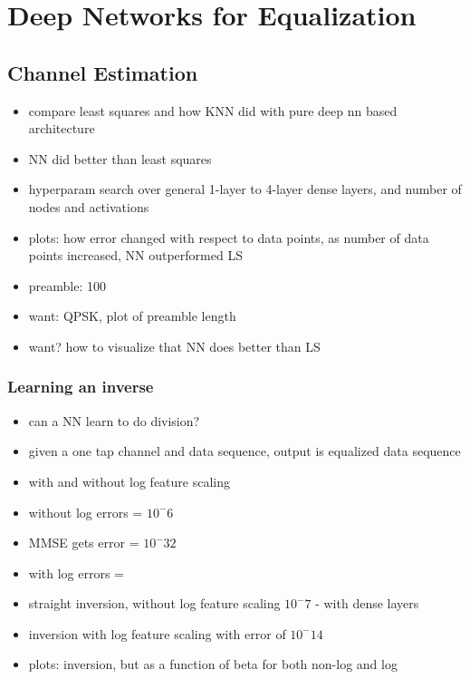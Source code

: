 \chapter{Deep Networks for Equalization}

\section{Channel Estimation}

\begin{itemize}
\item compare least squares and how KNN did with pure deep nn based architecture
\item NN did better than least squares
\item hyperparam search over general 1-layer to 4-layer dense layers, and number of nodes and activations
\item plots: how error changed with respect to data points, as number of data points increased, NN outperformed LS
\item preamble: 100
\item want: QPSK, plot of preamble length
\item want? how to visualize that NN does better than LS
\end{itemize}

\subsection{Learning an inverse}
\begin{itemize}
\item can a NN learn to do division?
\item given a one tap channel and data sequence, output is equalized data sequence
\item with and without log feature scaling
\item without log errors = $10^-6$
\item MMSE gets error = $10^-32$
\item with log errors = 
\item straight inversion, without log feature scaling $10^-7$ - with dense layers
\item inversion with log feature scaling with error of $10^-14$ 
\item plots: inversion, but as a function of beta for both non-log and log
\end{itemize}

